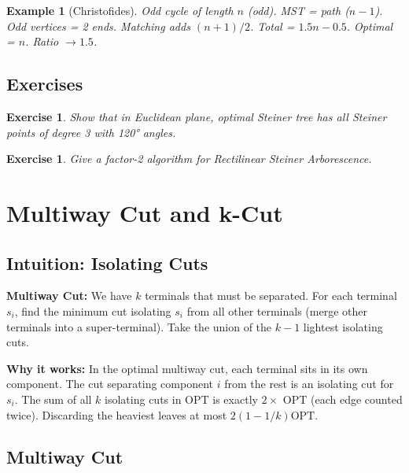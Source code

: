 \documentclass[11pt,oneside]{book}
\newtheorem{example}[theorem]{Example}
\newtheorem{exercise}[theorem]{Exercise}
\newcommand{\OPT}{\mathrm{OPT}}
\begin{document}
\begin{example}[Christofides]
Odd cycle of length $n$ (odd). MST = path ($n-1$). Odd vertices = 2 ends. Matching adds $(n+1)/2$. Total = $1.5n - 0.5$. Optimal = $n$. Ratio $\to 1.5$.
\end{example}

\section{Exercises}
\begin{exercise}
Show that in Euclidean plane, optimal Steiner tree has all Steiner points of degree 3 with 120° angles.
\end{exercise}
\begin{exercise}
Give a factor-2 algorithm for Rectilinear Steiner Arborescence.
\end{exercise}

\setcounter{chapter}{3}
\chapter{Multiway Cut and k-Cut}
\label{ch:multiway}

\section{Intuition: Isolating Cuts}

\begin{intuitionbox}
\textbf{Multiway Cut:} We have $k$ terminals that must be separated. For each terminal $s_i$, find the minimum cut isolating $s_i$ from all other terminals (merge other terminals into a super-terminal). Take the union of the $k-1$ lightest isolating cuts.

\textbf{Why it works:} In the optimal multiway cut, each terminal sits in its own component. The cut separating component $i$ from the rest is an isolating cut for $s_i$. The sum of all $k$ isolating cuts in OPT is exactly $2 \times$ OPT (each edge counted twice). Discarding the heaviest leaves at most $2(1-1/k)\OPT$.
\end{intuitionbox}

\section{Multiway Cut}
\end{document}
